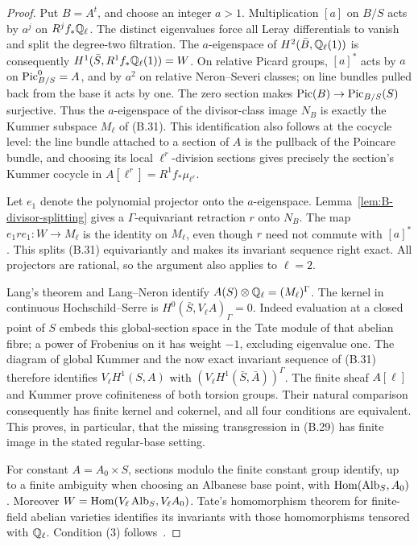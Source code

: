 \begin{proof}
Put \(B=A^t\), and choose an integer \(a>1\).  Multiplication
\([a]\) on \(B/S\) acts by \(a^j\) on \(R^jf_*\mathbb Q_\ell\).
The distinct eigenvalues force all Leray differentials to vanish
and split the degree-two filtration.  The \(a\)-eigenspace of
\(H^2(\bar B,\mathbb Q_\ell(1))\) is consequently
\(H^1(\bar S,R^1f_*\mathbb Q_\ell(1))=W\).
On relative Picard groups, \([a]^*\) acts by \(a\) on
\(\operatorname{Pic}^0_{B/S}=A\), and by \(a^2\) on relative
Neron--Severi classes; on line bundles pulled back from the base
it acts by one.  The zero section makes
\(\operatorname{Pic}(B)\to\operatorname{Pic}_{B/S}(S)\) surjective.  Thus the
\(a\)-eigenspace of the divisor-class image \(N_B\) is exactly
the Kummer subspace \(M_\ell\) of (B.31).  This identification
also follows at the cocycle level: the line bundle attached to a
section of \(A\) is the pullback of the Poincare bundle, and
choosing its local \(\ell^r\)-division sections gives precisely
the section's Kummer cocycle in \(A[\ell^r]=R^1f_*\mu_{\ell^r}\).

Let \(e_1\) denote the polynomial projector onto the
\(a\)-eigenspace.  Lemma~\ref{lem:B-divisor-splitting} gives a
\(\Gamma\)-equivariant retraction \(r\) onto \(N_B\).
The map \(e_1re_1:W\to M_\ell\) is the identity on
\(M_\ell\), even though \(r\) need not commute with \([a]^*\).
This splits (B.31) equivariantly and makes its invariant sequence
right exact.  All projectors are rational, so the argument also
applies to \(\ell=2\).

Lang's theorem and Lang--Neron identify
\(A(S)\otimes\mathbb Q_\ell=(M_\ell)^\Gamma\).
The kernel in continuous Hochschild--Serre is
\(H^0(\bar S,V_\ell A)_\Gamma=0\).  Indeed evaluation at a
closed point of \(S\) embeds this global-section space in the
Tate module of that abelian fibre; a power of Frobenius on it has
weight \(-1\), excluding eigenvalue one.  The diagram of global
Kummer and the now exact invariant sequence of (B.31) therefore
identifies
\(V_\ell H^1(S,A)\) with
\((V_\ell H^1(\bar S,\bar A))^\Gamma\).
The finite sheaf \(A[\ell]\) and Kummer prove cofiniteness of
both torsion groups.  Their natural comparison consequently has
finite kernel and cokernel, and all four conditions are equivalent.
This proves, in particular, that the missing transgression in
(B.29) has finite image in the stated regular-base setting.

For constant \(A=A_0\times S\), sections modulo the finite
constant group identify, up to a finite ambiguity when choosing an
Albanese base point, with \(\operatorname{Hom}(\operatorname{Alb}_S,A_0)\).
Moreover
\(W=\operatorname{Hom}(V_\ell\operatorname{Alb}_S,V_\ell A_0)\).
Tate's homomorphism theorem for finite-field abelian varieties
identifies its invariants with those homomorphisms tensored with
\(\mathbb Q_\ell\).  Condition (3) follows~\cite[Main Theorem, \S1]{BTate1966}.
\end{proof}

